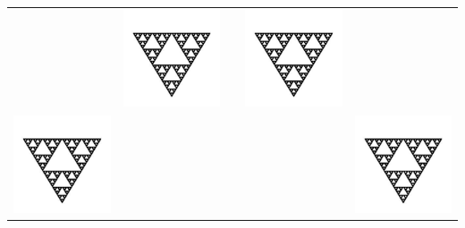 \documentclass[letterpaper,12pt]{article}
\begin{document}
\begin{table}[h!]
\begin{tabular}{|ccccc|}
 & \includegraphics[angle=90,scale=0.32]{fractal} &  & \includegraphics[angle=90,scale=0.32]{fractal} & \\
\includegraphics[angle=60,scale=0.32]{fractal} &  &  &  & \includegraphics[angle=60,scale=0.32]{fractal}\\

\end{tabular}
\end{table}
\end{document}
